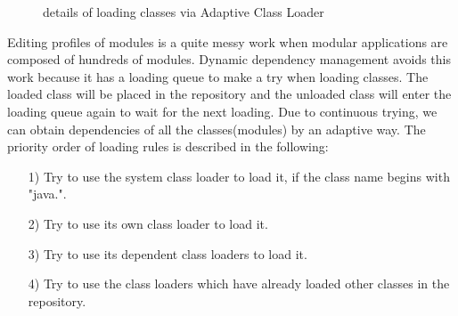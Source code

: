 \documentclass[conference]{IEEEtran}
\begin{document}
\begin{figure}[ht]
\centering
{}
\hfil
{}
\hfil
{}
\caption{details of loading classes via Adaptive Class Loader}
\label{fig:loading_queue}
\end{figure}

Editing profiles of modules is a quite messy work when modular applications are composed of hundreds of modules.
Dynamic dependency management avoids this work because it has a loading queue to make a try when loading classes.
The loaded class will be placed in the repository and the unloaded class will enter the loading queue again to wait for the next loading.
Due to continuous trying, we can obtain dependencies of all the classes(modules) by an adaptive way.
The priority order of loading rules is described in the following:
\begin{itemize}[]
\item[1)] Try to use the system class loader to load it, if the class name begins with "java.".
\item[2)] Try to use its own class loader to load it.
\item[3)] Try to use its dependent class loaders to load it.
\item[4)] Try to use the class loaders which have already loaded other classes in the repository. 
\end{itemize}
\end{document}
